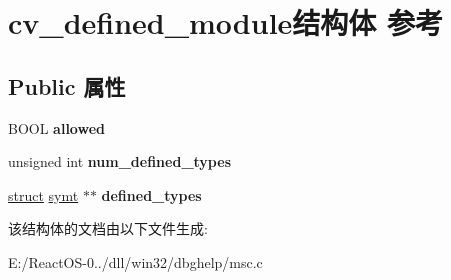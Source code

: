 \hypertarget{structcv__defined__module}{}\section{cv\+\_\+defined\+\_\+module结构体 参考}
\label{structcv__defined__module}
\subsection*{Public 属性}
\begin{DoxyCompactItemize}
\item 
\mbox{\label{structcv__defined__module_aad29ba50442c44d5d25bfd1e0dcad8ac}} 
B\+O\+OL {\bfseries allowed}
\item 
\mbox{\label{structcv__defined__module_a07b3e6499ae8ca15ccb8e76b963d4e01}} 
unsigned int {\bfseries num\+\_\+defined\+\_\+types}
\item 
\mbox{\label{structcv__defined__module_acbf86d6291c99a950e268d2fe64e672c}} 
\hyperlink{interfacestruct}{struct} \hyperlink{structsymt}{symt} $\ast$$\ast$ {\bfseries defined\+\_\+types}
\end{DoxyCompactItemize}


该结构体的文档由以下文件生成\+:\begin{DoxyCompactItemize}
\item 
E\+:/\+React\+O\+S-\/0../dll/win32/dbghelp/msc.\+c\end{DoxyCompactItemize}
